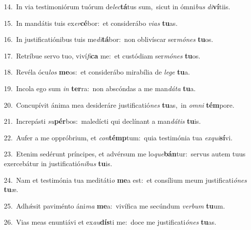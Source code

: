 {\numbfont\textcolor{\numbcolor}{14.}}~In via testimoniórum tuórum de\-\textit{lec}\-\textbf{tá}tus sum,~\star sicut in ómni\textit{bus} \textit{di}\-\textbf{ví}tiis.\par
{\numbfont\textcolor{\numbcolor}{15.}}~In mandátis tuis ex\-\textit{er}\-\textbf{cé}bor:~\star et considerábo \textit{vi}\-\textit{as} \textbf{tu}\-as.\par
{\numbfont\textcolor{\numbcolor}{16.}}~In justificatiónibus tuis me\-\textit{di}\-\textbf{tá}bor:~\star non oblivíscar ser\-\textit{mó}\-\textit{nes} \textbf{tu}\-os.\par
{\numbfont\textcolor{\numbcolor}{17.}}~Retríbue servo tuo, viví\-\textit{fi}\-\textbf{ca} me:~\star et custódiam ser\-\textit{mó}\-\textit{nes} \textbf{tu}\-os.\par
{\numbfont\textcolor{\numbcolor}{18.}}~Revéla ócu\textit{los} \textbf{me}\-os:~\star et considerábo mirabília de \textit{le}\-\textit{ge} \textbf{tu}\-a.\par
{\numbfont\textcolor{\numbcolor}{19.}}~Incola ego sum \textit{in} \textbf{ter}\-ra:~\star non abscóndas a me man\-\textit{dá}\-\textit{ta} \textbf{tu}\-a.\par
{\numbfont\textcolor{\numbcolor}{20.}}~Concupívit ánima mea desideráre justificatió\textit{nes} \textbf{tu}\-as,~\star in \textit{om}\-\textit{ni} \textbf{tém}\-pore.\par
{\numbfont\textcolor{\numbcolor}{21.}}~Increpásti \textit{su}\-\textbf{pér}bos:~\star maledícti qui declínant a man\-\textit{dá}\-\textit{tis} \textbf{tu}\-is.\par
{\numbfont\textcolor{\numbcolor}{22.}}~Aufer a me oppróbrium, et \textit{con}\-\textbf{témp}tum:~\star quia testimónia tua \textit{ex}\-\textit{qui}\textbf{sí}vi.\par
{\numbfont\textcolor{\numbcolor}{23.}}~Etenim sedérunt príncipes, et advérsum me lo\-\textit{que}\-\textbf{bán}tur:~\star servus autem tuus exercebátur in justificatió\-\textit{ni}\-\textit{bus} \textbf{tu}\-is.\par
{\numbfont\textcolor{\numbcolor}{24.}}~Nam et testimónia tua meditáti\textit{o} \textbf{me}\-a est:~\star et consílium meum justificati\-\textit{ó}\-\textit{nes} \textbf{tu}\-æ.\par
{\numbfont\textcolor{\numbcolor}{25.}}~Adhǽsit paviménto áni\textit{ma} \textbf{me}\-a:~\star vivífica me secúndum \textit{ver}\-\textit{bum} \textbf{tu}\-um.\par
{\numbfont\textcolor{\numbcolor}{26.}}~Vias meas enuntiávi et ex\-\textit{au}\-\textbf{dís}ti me:~\star doce me justificati\-\textit{ó}\-\textit{nes} \textbf{tu}\-as.\par
